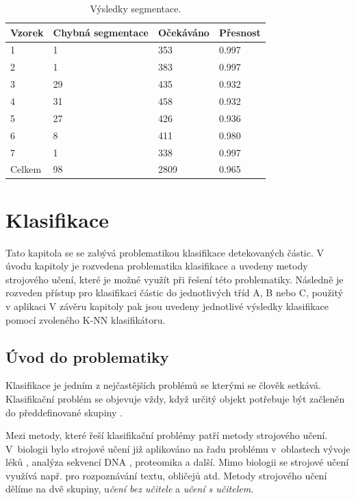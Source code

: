 \documentclass[11pt,twoside,a4paper,table]{book}
\begin{document}
\begin{table}[htp]
\centering
\begin{tabular}{|l|l|l|l|}
\hline
\rowcolor[HTML]{C0C0C0} 
Vzorek & Chybná segmentace & Očekáváno & Přesnost \\ \hline
1      & 1                 & 353       & 0.997    \\ \hline
2      & 1                 & 383       & 0.997    \\ \hline
3      & 29                & 435       & 0.932    \\ \hline
4      & 31                & 458       & 0.932    \\ \hline
5      & 27                & 426       & 0.936    \\ \hline
6      & 8                 & 411       & 0.980    \\ \hline
7      & 1                 & 338       & 0.997    \\ \hline
Celkem & 98                & 2809      & 0.965    \\ \hline
\end{tabular}
\caption{Výsledky segmentace.}
\label{tab:segment_results}
\end{table}

\chapter{Klasifikace}
\label{sec:klasifikace}
Tato kapitola se se zabývá problematikou klasifikace detekovaných částic. V úvodu kapitoly je rozvedena problematika klasifikace a uvedeny metody strojového učení, které je možné využít při řešení této problematiky. Následně je rozveden přístup pro klasifikaci částic do jednotlivých tříd A, B nebo C, použitý v aplikaci  V závěru kapitoly pak jsou uvedeny jednotlivé výsledky klasifikace pomocí zvoleného K-NN klasifikátoru.

\section{Úvod do problematiky}
Klasifikace je jedním z nejčastějších problémů se kterými se člověk setkává. Klasifikační problém se objevuje vždy, když určitý objekt potřebuje být začleněn do předdefinované skupiny \cite{art:neural_networks}.

Mezi metody, které řeší klasifikační problémy patří metody strojového učení. V~biologii bylo strojové učení již aplikováno na řadu problému v~oblastech vývoje léků \cite{art:machine1}, analýza sekvencí DNA \cite{art:machine2}, proteomika \cite{art:machine3} a další. Mimo biologii se strojové učení využívá např. pro rozpoznávání textu, obličejů atd. Metody strojového učení dělíme na dvě skupiny, u\textit{čení bez učitele} a \textit{učení s učitelem}.
\end{document}
